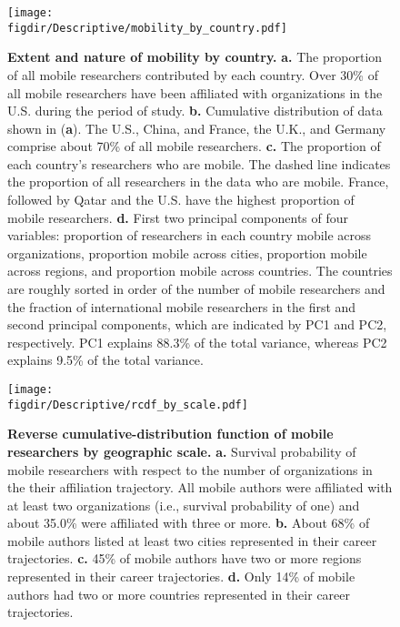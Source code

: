 \documentclass[12pt]{article} %
\def\figdir{../Figs}
\begin{document}
%
%
\begin{figure}[p!]
	\centering
	\texttt{[image: \\figdir/Descriptive/mobility\_by\_country.pdf]}
	\caption{
		\textbf{Extent and nature of mobility by country.}
		\textbf{a.}
		The proportion of all mobile researchers contributed by each country. 
		Over 30\% of all mobile researchers have been affiliated with organizations in the U.S. during the period of study.
		\textbf{b.}
		Cumulative distribution of data shown in (\textbf{a}).
		The U.S., China, and France, the U.K., and Germany comprise about 70\% of all mobile researchers. 
		\textbf{c.} 
		The proportion of each country's researchers who are mobile.
		The dashed line indicates the proportion of all researchers in the data who are mobile. 
		France, followed by Qatar and the U.S. have the highest proportion of mobile researchers. 
		\textbf{d.} First two principal components of four variables: proportion of researchers in each country mobile across organizations, proportion mobile across cities, proportion mobile across regions, and proportion mobile across countries.
		The countries are roughly sorted in order of the number of mobile researchers and the fraction of international mobile researchers in the first and second principal components, which are indicated by PC1 and PC2, respectively. 
		PC1 explains 88.3\% of the total variance, whereas PC2 explains 9.5\% of the total variance. 
	}
	\label{fig:supp:descriptives}
\end{figure}




\newpage
%
%
\begin{figure}[p!]
	\centering
	\texttt{[image: \\figdir/Descriptive/rcdf\_by\_scale.pdf]}
	\caption{
		\textbf{Reverse cumulative-distribution function of mobile researchers by geographic scale.}
		\textbf{a.}
		Survival probability of mobile researchers with respect to the number of organizations in the their affiliation trajectory.
		All mobile authors were affiliated with at least two organizations (i.e., survival probability of one) and about 35.0\% were affiliated with three or more. 
		\textbf{b.} About 68\% of mobile authors listed at least two cities represented in their career trajectories.
		\textbf{c.} 45\% of mobile authors have two or more regions represented in their career trajectories.
		\textbf{d.} Only 14\% of mobile authors had two or more countries represented in their career trajectories.
	}
	\label{fig:supp:rcdf_by_scale}
\end{figure}
\end{document}
